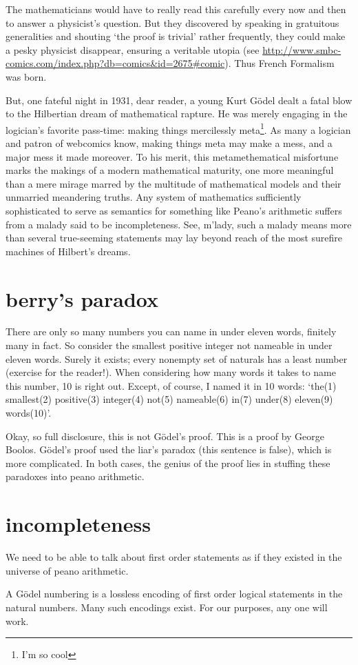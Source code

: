 \documentclass{scrbook}
\begin{document}
The mathematicians would have to really read this carefully every now and then to answer a physicist's question. But they discovered by speaking in gratuitous generalities and shouting `the proof is trivial' rather frequently, they could make a pesky physicist disappear, ensuring a veritable utopia (see \url{http://www.smbc-comics.com/index.php?db=comics&id=2675#comic}). Thus French Formalism was born.  

But, one fateful night in 1931, dear reader, a young Kurt Gödel dealt a fatal blow to the Hilbertian dream of mathematical rapture. He was merely engaging in the logician's favorite pass-time: making things mercilessly meta\footnote{I'm so cool}. As many a logician and patron of webcomics know, making things meta may make a mess, and a major mess it made moreover. To his merit, this metamethematical misfortune marks the makings of a modern mathematical maturity, one more meaningful than a mere mirage marred by the multitude of mathematical models and their unmarried meandering truths. Any system of mathematics sufficiently sophisticated to serve as semantics for something like Peano's arithmetic suffers from a malady said to be incompleteness. See, m'lady, such a malady means more than several true-seeming statements may lay beyond reach of the most surefire machines of Hilbert's dreams.

\section{berry's paradox}
There are only so many numbers you can name in under eleven words, finitely many in fact. So consider the smallest positive integer not nameable in under eleven words. Surely it exists; every nonempty set of naturals has a least number (exercise for the reader!). When considering how many words it takes to name this number, 10 is right out. Except, of course, I named it in 10 words: `the(1) smallest(2) positive(3) integer(4) not(5) nameable(6) in(7) under(8) eleven(9) words(10)'.  

Okay, so full disclosure, this is not Gödel's proof. This is a proof by George Boolos. Gödel's proof used the liar's paradox (this sentence is false), which is more complicated.\cite{wiki:incomplete-sketch} In both cases, the genius of the proof lies in stuffing these paradoxes into peano arithmetic.  

\section{incompleteness} 
We need to be able to talk about first order statements as if they existed in the universe of peano arithmetic.  
\begin{defn}
  A Gödel numbering is a lossless encoding of first order logical statements in the natural numbers. Many such encodings exist. For our purposes, any one will work. 
\end{defn}
\end{document}
